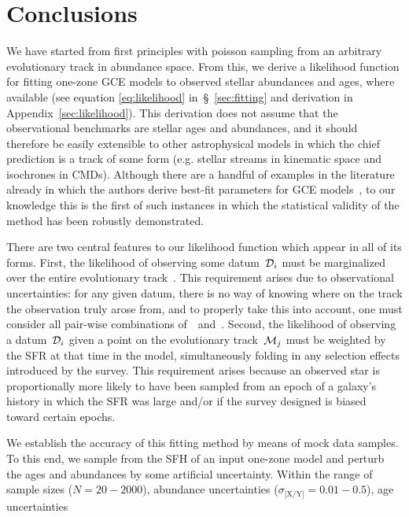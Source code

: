 \documentclass[ms.tex]{subfiles}
\begin{document}
\section{Conclusions}
\label{sec:conclusions}

We have started from first principles with poisson sampling from an arbitrary
evolutionary track in abundance space.
From this, we derive a likelihood function for fitting one-zone GCE models to
observed stellar abundances and ages, where available (see equation
\ref{eq:likelihood} in~\S~\ref{sec:fitting} and derivation in
Appendix~\ref{sec:likelihood}).
This derivation does not assume that the observational benchmarks are
stellar ages and abundances, and it should therefore be easily extensible to
other astrophysical models in which the chief prediction is a track of some
form (e.g. stellar streams in kinematic space and isochrones in CMDs).
Although there are a handful of examples in the literature already in which
the authors derive best-fit parameters for GCE models~\citep[e.g.][]{Kirby2011,
Spitoni2020, Spitoni2021, Hasselquist2021}, to our knowledge this is the first
of such instances in which the statistical validity of the method has been
robustly demonstrated.
\par
There are two central features to our likelihood function which appear in all
of its forms.
First, the likelihood of observing some datum~$\mathcal{D}_i$ must be
marginalized over the entire evolutionary track~.
This requirement arises due to observational uncertainties: for any given
datum, there is no way of knowing where on the track the observation truly
arose from, and to properly take this into account, one must consider all
pair-wise combinations of~~and~.
Second, the likelihood of observing a datum~$\mathcal{D}_i$ given a point on
the evolutionary track~$\mathcal{M}_j$ must be weighted by the SFR at that time
in the model, simultaneously folding in any selection effects introduced by the
survey.
This requirement arises because an observed star is proportionally more likely
to have been sampled from an epoch of a galaxy's history in which the SFR was
large and/or if the survey designed is biased toward certain epochs.
\par
We establish the accuracy of this fitting method by means of mock data samples.
To this end, we sample from the SFH of an input one-zone model and perturb the
ages and abundances by some artificial uncertainty.
Within the range of sample sizes ($N = 20 - 2000$), abundance uncertainties
($\sigma_\text{[X/Y]} = 0.01 - 0.5$), age uncertainties
\end{document}
